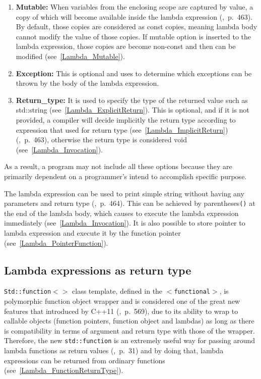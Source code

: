 \documentclass[11pt]{report}
\begin{document}
\begin{enumerate}
\item \textbf{Mutable:} When variables from the enclosing scope are captured by value, a copy of which will become available inside the lambda expression (\cite{Cppreference:2012:Cpp11},~p.~463). By default, those copies are considered as const copies, meaning lambda body cannot modify the value of those copies. If mutable option is inserted to the lambda expression, those copies are become non-const and then can be modified (see~\ref{Lambda_Mutable}).

\item \textbf{Exception:} This is optional and uses to determine which exceptions can be thrown by the body of the lambda expression.

\item \textbf{Return\_type:} It is used to specify the type of the returned value such as std::string (see~\ref{Lambda_ExplicitReturn}). This is optional, and if it is not provided, a compiler will decide implicitly the return type according to expression that used for return type (see~\ref{Lambda_ImplicitReturn}) (\cite{Cppreference:2012:Cpp11},~p.~463), otherwise the return type is considered void (see~\ref{Lambda_Invocation}).
\end{enumerate}

As a result, a program may not include all these options because they are primarily dependent on a programmer's intend to accomplish specific purpose.

The lambda expression can be used to print simple string without having any parameters and return type (\cite{Gregorie:professionalcpp},~p.~464). This can be achieved by parentheses\texttt{()} at the end of the lambda body, which causes to execute the lambda expression immediately (see~\ref{Lambda_Invocation}). It is also possible to store pointer to lambda expression and execute it by the function pointer (see~\ref{Lambda_PointerFunction}).

\subsection{Lambda expressions as return type}
\label{subsection: Lambda Expressions as Return Type}
\texttt{Std::function$<>$} class template, defined in the \texttt{$<$functional$>$}, is polymorphic function object wrapper and is considered one of the great new features that introduced by C++11 (\cite{Gregorie:professionalcpp},~p.~569), due to its ability to wrap to callable objects (function pointers, function object and lambdas) as long as there is compatibility in terms of argument and return type with those of the wrapper. Therefore, the new \texttt{std::function} is an extremely useful way for passing around lambda functions as return values (\cite{Josuttis:2012:CppStandard},~p.~31) and by doing that, lambda expressions can be returned from ordinary functions (see~\ref{Lambda_FunctionReturnType}).
\end{document}
